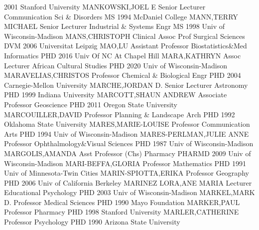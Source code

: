 \documentclass[
]{article}
\begin{document}
2001 Stanford University \textbar{}  \textbar MANKOWSKI,JOEL
E \textbar Senior Lecturer \textbar Communication Sci \& Disorders
\textbar MS 1994 McDaniel College \textbar{} 
\textbar MANN,TERRY MICHAEL \textbar Senior Lecturer \textbar Industrial
\& Systems Engr \textbar MS 1998 Univ of Wisconsin-Madison \textbar{}
 \textbar MANS,CHRISTOPH \textbar Clinical Assoc Prof
\textbar Surgical Sciences \textbar DVM 2006 Universitat Leipzig
\textbar{}  \textbar MAO,LU \textbar Assistant Professor
\textbar Biostatistics\&Med Informatics \textbar PHD 2016 Univ Of NC At
Chapel Hill \textbar{}  \textbar MARA,KATHRYN \textbar Assoc
Lecturer \textbar African Cultural Studies \textbar PHD 2020 Univ of
Wisconsin-Madison \textbar{}  \textbar MARAVELIAS,CHRISTOS
\textbar Professor \textbar Chemical \& Biological Engr \textbar PHD
2004 Carnegie-Mellon University \textbar{} 
\textbar MARCHE,JORDAN D. \textbar Senior Lecturer \textbar Astronomy
\textbar PHD 1999 Indiana University \textbar{} 
\textbar MARCOTT,SHAUN ANDREW \textbar Associate Professor
\textbar Geoscience \textbar PHD 2011 Oregon State University \textbar{}
 \textbar MARCOUILLER,DAVID \textbar Professor
\textbar Planning \& Landscape Arch \textbar PHD 1992 Oklahoma State
University \textbar{}  \textbar MARES,MARIE-LOUISE
\textbar Professor \textbar Communication Arts \textbar PHD 1994 Univ of
Wisconsin-Madison \textbar{}  \textbar MARES-PERLMAN,JULIE
ANNE \textbar Professor \textbar Ophthalmology\&Visual Sciences
\textbar PHD 1987 Univ of Wisconsin-Madison \textbar{} 
\textbar MARGOLIS,AMANDA \textbar Asst Professor (Chs) \textbar Pharmacy
\textbar PHARMD 2009 Univ of Wisconsin-Madison \textbar{} 
\textbar MARI-BEFFA,GLORIA \textbar Professor \textbar Mathematics
\textbar PHD 1991 Univ of Minnesota-Twin Cities \textbar{} 
\textbar MARIN-SPIOTTA,ERIKA \textbar Professor \textbar Geography
\textbar PHD 2006 Univ of California Berkeley \textbar{} 
\textbar MARINEZ LORA,ANE MARIA \textbar Lecturer \textbar Educational
Psychology \textbar PHD 2003 Univ of Wisconsin-Madison \textbar{}
 \textbar MARKEL,MARK D. \textbar Professor \textbar Medical
Sciences \textbar PHD 1990 Mayo Foundation \textbar{} 
\textbar MARKER,PAUL \textbar Professor \textbar Pharmacy \textbar PHD
1998 Stanford University \textbar{} 
\textbar MARLER,CATHERINE \textbar Professor \textbar Psychology
\textbar PHD 1990 Arizona State University \textbar{} 
\end{document}
